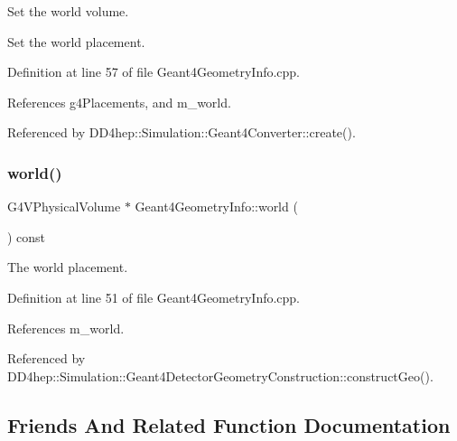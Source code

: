 Set the world volume. 

Set the world placement. 

Definition at line 57 of file Geant4\+Geometry\+Info.\+cpp.



References g4\+Placements, and m\+\_\+world.



Referenced by D\+D4hep\+::\+Simulation\+::\+Geant4\+Converter\+::create().

\hypertarget{class_d_d4hep_1_1_simulation_1_1_geant4_geometry_info_a94a69c8ce55611620b823c38e35f65a5}{}\label{class_d_d4hep_1_1_simulation_1_1_geant4_geometry_info_a94a69c8ce55611620b823c38e35f65a5} 
\subsubsection{\texorpdfstring{world()}{world()}}
{\footnotesize\ttfamily G4\+V\+Physical\+Volume $\ast$ Geant4\+Geometry\+Info\+::world (\begin{DoxyParamCaption}{ }\end{DoxyParamCaption}) const}



The world placement. 



Definition at line 51 of file Geant4\+Geometry\+Info.\+cpp.



References m\+\_\+world.



Referenced by D\+D4hep\+::\+Simulation\+::\+Geant4\+Detector\+Geometry\+Construction\+::construct\+Geo().



\subsection{Friends And Related Function Documentation}
\hypertarget{class_d_d4hep_1_1_simulation_1_1_geant4_geometry_info_a1fe4b6e068c20a04fa1a7226219dac7c}{}\label{class_d_d4hep_1_1_simulation_1_1_geant4_geometry_info_a1fe4b6e068c20a04fa1a7226219dac7c} 
